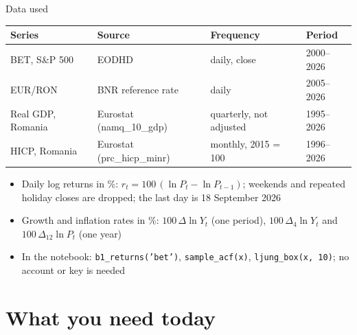 \begin{frame}{Data used}
\itemsize{\small}
\begin{center}
\footnotesize
\begin{tabular}{llll}
\toprule
\textbf{Series} & \textbf{Source} & \textbf{Frequency} & \textbf{Period} \\
\midrule
BET, S\&P 500 & EODHD & daily, close & 2000--2026 \\
EUR/RON & BNR reference rate & daily & 2005--2026 \\
Real GDP, Romania & Eurostat (namq\_10\_gdp) & quarterly, not adjusted & 1995--2026 \\
HICP, Romania & Eurostat (prc\_hicp\_minr) & monthly, 2015 = 100 & 1996--2026 \\
\bottomrule
\end{tabular}
\end{center}
\begin{itemize}
    \item Daily log returns in \%: $r_t = 100\,(\ln P_t - \ln P_{t-1})$; weekends and repeated holiday closes are dropped; the last day is 18 September 2026
    \item Growth and inflation rates in \%: $100\,\Delta\ln Y_t$ (one period), $100\,\Delta_4\ln Y_t$ and $100\,\Delta_{12}\ln P_t$ (one year)
    \item In the notebook: \texttt{b1\_returns('bet')}, \texttt{sample\_acf(x)}, \texttt{ljung\_box(x, 10)}; no account or key is needed
\end{itemize}
\end{frame}


\section{What you need today}

